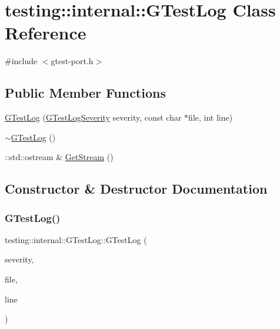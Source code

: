 \hypertarget{classtesting_1_1internal_1_1GTestLog}{}\section{testing\+::internal\+::G\+Test\+Log Class Reference}
\label{classtesting_1_1internal_1_1GTestLog}


{\ttfamily \#include $<$gtest-\/port.\+h$>$}

\subsection*{Public Member Functions}
\begin{DoxyCompactItemize}
\item 
\mbox{\hyperlink{classtesting_1_1internal_1_1GTestLog_a364691bf972983a59cfa2891062a64af}{G\+Test\+Log}} (\mbox{\hyperlink{namespacetesting_1_1internal_aa6255ef3b023c5b4e1a2198d887fb977}{G\+Test\+Log\+Severity}} severity, const char $\ast$file, int line)
\item 
\mbox{\hyperlink{classtesting_1_1internal_1_1GTestLog_a978a099703bbaa0f380216e8d7ee03d3}{$\sim$\+G\+Test\+Log}} ()
\item 
\+::std\+::ostream \& \mbox{\hyperlink{classtesting_1_1internal_1_1GTestLog_aebb92e67d98eca69f0347d5121dab27a}{Get\+Stream}} ()
\end{DoxyCompactItemize}


\subsection{Constructor \& Destructor Documentation}
\mbox{\label{classtesting_1_1internal_1_1GTestLog_a364691bf972983a59cfa2891062a64af}} 
\subsubsection{\texorpdfstring{GTestLog()}{GTestLog()}}
{\footnotesize\ttfamily testing\+::internal\+::\+G\+Test\+Log\+::\+G\+Test\+Log (\begin{DoxyParamCaption}\item[{\mbox{\hyperlink{namespacetesting_1_1internal_aa6255ef3b023c5b4e1a2198d887fb977}{G\+Test\+Log\+Severity}}}]{severity,  }\item[{const char $\ast$}]{file,  }\item[{int}]{line }\end{DoxyParamCaption})}

